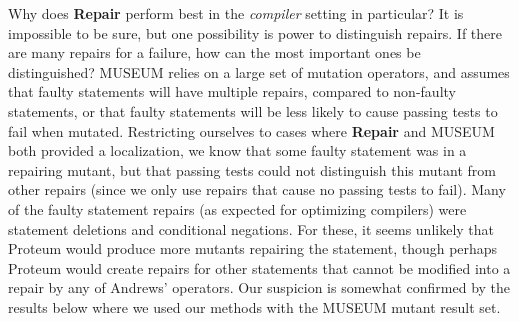  Why does {\bf Repair} perform best in the \emph{compiler} setting in particular?  It is impossible to be sure, but one  possibility is power to distinguish repairs.  If there are many repairs for a failure, how can the most important ones be distinguished?  MUSEUM relies on a large set of mutation operators, and assumes that faulty statements will have multiple repairs, compared to non-faulty statements, or that faulty statements will be less likely to cause passing tests to fail when mutated.  Restricting ourselves to cases where {\bf Repair} and MUSEUM both provided a localization, we know that some faulty statement was in a repairing mutant, but that passing tests could not distinguish this mutant  from other repairs (since we only use repairs that cause no passing tests to fail).  Many of the faulty statement repairs (as expected for optimizing compilers) were statement deletions and conditional negations.  For these, it seems unlikely that Proteum would produce more mutants repairing the statement, though perhaps Proteum would create repairs for other statements that cannot be modified into a repair by any of Andrews' operators.  Our suspicion is somewhat confirmed by the results below where we used our methods with the MUSEUM mutant result set.

